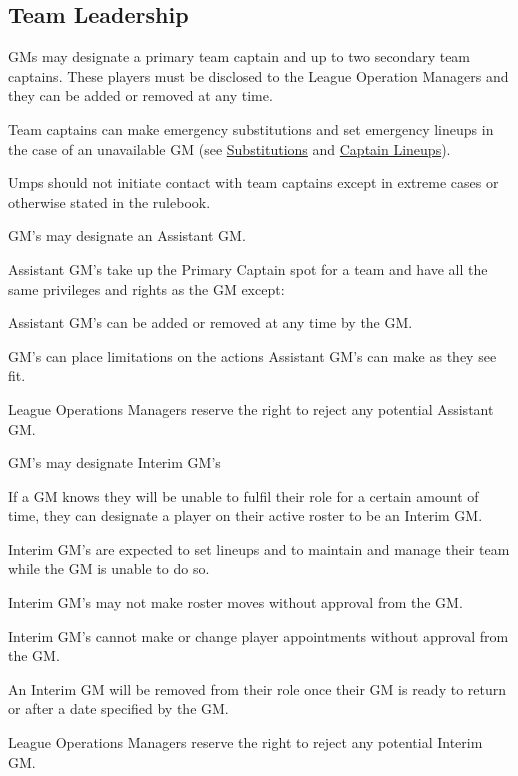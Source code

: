 \subsection{Team Leadership}
\begin{deepEnumerate}
	\item GMs may designate a primary team captain and up to two secondary team captains.
	These players must be disclosed to the League Operation Managers and they can be added or removed at any time.
	\begin{deepEnumerate}
		\item Team captains can make emergency substitutions and set emergency lineups in the case of an unavailable GM
	(see \hyperref[sec:substitutions]{Substitutions} and \hyperref[sec:captain lineups]{Captain Lineups}).
		\begin{deepEnumerate}
			\item Umps should not initiate contact with team captains except in extreme cases or otherwise stated in the rulebook.
		\end{deepEnumerate}
	\end{deepEnumerate}
	\item GM’s may designate an Assistant GM.
	\begin{deepEnumerate}
		\item Assistant GM’s take up the Primary Captain spot for a team and have all the same privileges and rights as the GM except:
		\begin{deepEnumerate}
			\item Assistant GM’s can be added or removed at any time by the GM.
			\item GM’s can place limitations on the actions Assistant GM’s can make as they see fit.
			\item League Operations Managers reserve the right to reject any potential Assistant GM.
		\end{deepEnumerate}
	\end{deepEnumerate}
	\item GM’s may designate Interim GM’s
	\begin{deepEnumerate}
		\item If a GM knows they will be unable to fulfil their role for a certain amount of time, they can designate a player on their active roster to be an Interim GM.
		\begin{deepEnumerate}
			\item Interim GM’s are expected to set lineups and to maintain and manage their team while the GM is unable to do so.
		\end{deepEnumerate}
	\item Interim GM’s may not make roster moves without approval from the GM.
	\item Interim GM’s cannot make or change player appointments without approval from the GM.
	\item An Interim GM will be removed from their role once their GM is ready to return or after a date specified by the GM.
	\item League Operations Managers reserve the right to reject any potential Interim GM.
	\end{deepEnumerate}
\end{deepEnumerate}

